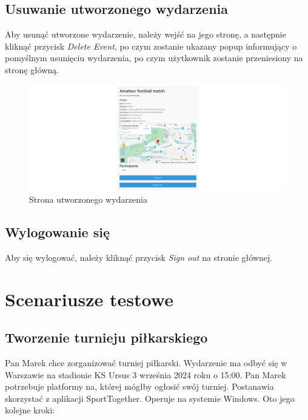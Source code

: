 \documentclass[11pt,a4paper]{article}
\begin{document}
\subsection{Usuwanie utworzonego wydarzenia}

Aby usunąć utworzone wydarzenie, należy wejść na jego stronę, a następnie kliknąć przycisk \textit{Delete Event}, po czym zostanie ukazany popup informujący o pomyślnym usunięciu wydarzenia, po czym użytkownik zostanie przeniesiony na stronę główną.

\begin{figure} [H]
    \centering
    \includegraphics[width=1\linewidth]{pages/my_event.png}
    \caption{Strona utworzonego wydarzenia}
\end{figure}

\subsection{Wylogowanie się}

Aby się wylogować, należy kliknąć przycisk \textit{Sign out} na stronie głównej.

\section{Scenariusze testowe}

\subsection{Tworzenie turnieju piłkarskiego}

Pan Marek chce zorganizować turniej piłkarski. Wydarzenie ma odbyć się w Warszawie na stadionie KS Ursus 3 września 2024 roku o 15:00. Pan Marek potrzebuje platformy na, której mógłby ogłosić swój turniej. Postanawia skorzystać z aplikacji SportTogether. Operuje na systemie Windows. Oto jego kolejne kroki:
\end{document}
